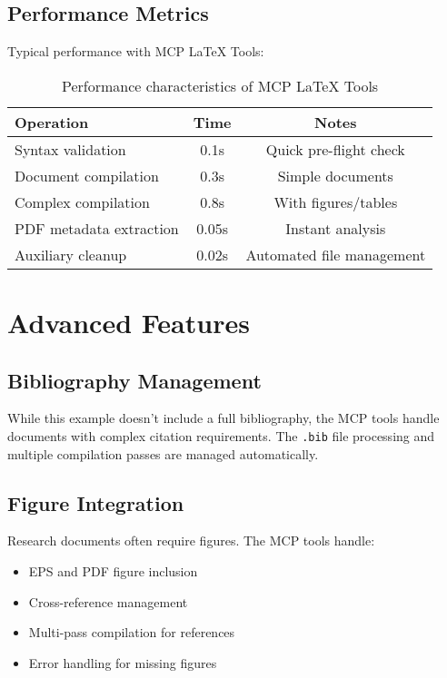 \documentclass[12pt]{article}
\begin{document}
\subsection{Performance Metrics}

Typical performance with MCP LaTeX Tools:

\begin{table}[h]
\centering
\begin{tabular}{|l|c|c|}
\hline
\textbf{Operation} & \textbf{Time} & \textbf{Notes} \\
\hline
Syntax validation & 0.1s & Quick pre-flight check \\
Document compilation & 0.3s & Simple documents \\
Complex compilation & 0.8s & With figures/tables \\
PDF metadata extraction & 0.05s & Instant analysis \\
Auxiliary cleanup & 0.02s & Automated file management \\
\hline
\end{tabular}
\caption{Performance characteristics of MCP LaTeX Tools}
\end{table}

\section{Advanced Features}

\subsection{Bibliography Management}

While this example doesn't include a full bibliography, the MCP tools handle documents with complex citation requirements. The \texttt{.bib} file processing and multiple compilation passes are managed automatically.

\subsection{Figure Integration}

Research documents often require figures. The MCP tools handle:

\begin{itemize}
    \item EPS and PDF figure inclusion
    \item Cross-reference management
    \item Multi-pass compilation for references
    \item Error handling for missing figures
\end{itemize}
\end{document}
